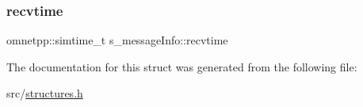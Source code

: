\mbox{\label{structs__message_info_a3600b24205dc07ce06774af44976c107}} 
\subsubsection{\texorpdfstring{recvtime}{recvtime}}
{\footnotesize\ttfamily omnetpp\+::simtime\+\_\+t s\+\_\+message\+Info\+::recvtime}



The documentation for this struct was generated from the following file\+:\begin{DoxyCompactItemize}
\item 
src/\hyperlink{structures_8h}{structures.\+h}\end{DoxyCompactItemize}
